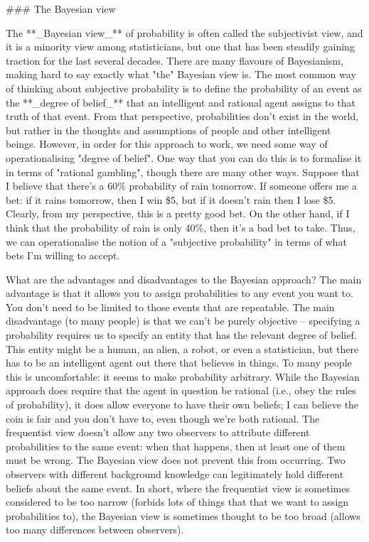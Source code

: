 ### The Bayesian view

The **_Bayesian view_** of probability is often called the subjectivist view, and it is a minority view among statisticians, but one that has been steadily gaining traction for the last several decades. There are many flavours of Bayesianism, making hard to say exactly what "the" Bayesian view is. The most common way of thinking about subjective probability is to define the probability of an event as the **_degree of belief_** that an intelligent and rational agent assigns to that truth of that event. From that perspective, probabilities don't exist in the world, but rather in the thoughts and assumptions of people and other intelligent beings.
However, in order for this approach to work, we need some way of operationalising "degree of belief". One way that you can do this is to formalise it in terms of "rational gambling", though there are many other ways. Suppose that I believe that there's a 60\% probability of rain tomorrow. If someone offers me a bet: if it rains tomorrow, then I win \$5, but if it doesn't rain then I lose \$5. Clearly, from my perspective, this is a pretty good bet. On the other hand, if I think that the probability of rain is only 40\%, then it's a bad bet to take. Thus, we can operationalise the notion of a "subjective probability" in terms of what bets I'm willing to accept. 

What are the advantages and disadvantages to the Bayesian approach? The main advantage is that it allows you to assign probabilities to any event you want to. You don't need to be limited to those events that are repeatable. The main disadvantage (to many people) is that we can't be purely objective -- specifying a probability requires us to specify an entity that has the relevant degree of belief. This entity might be a human, an alien, a robot, or even a statistician, but there has to be an intelligent agent out there that believes in things. To many people this is uncomfortable: it seems to make probability arbitrary. While the Bayesian approach does require that the agent in question be rational (i.e., obey the rules of probability), it does allow everyone to have their own beliefs; I can believe the coin is fair and you don't have to, even though we're both rational. The frequentist view doesn't allow any two observers to attribute different probabilities to the same event: when that happens, then at least one of them must be wrong. The Bayesian view does not prevent this from occurring. Two observers with different background knowledge can legitimately hold different beliefs about the same event. In short, where the frequentist view is sometimes considered to be too narrow (forbids lots of things that that we want to assign probabilities to), the Bayesian view is sometimes thought to be too broad (allows too many differences between observers). 



